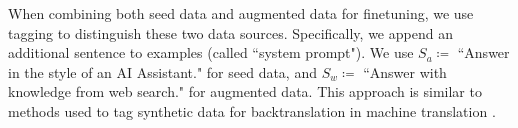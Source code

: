 When combining both seed data and augmented data for finetuning, we use tagging to distinguish these two data sources. Specifically, we append an additional sentence to examples (called ``system prompt"). We use $S_a \coloneqq$ ``Answer in the style of an AI Assistant." for seed data, and $S_w \coloneqq$ ``Answer with knowledge from web search." for augmented data. This approach is similar to methods used to tag synthetic data for backtranslation in machine translation \citep{caswell2019tagged}.

